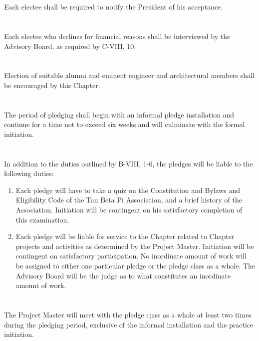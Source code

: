 \documentclass[12pt]{constitution}
\begin{document}
\section{}
Each electee shall be required to notify the President of his acceptance.
\section{}
Each electee who declines for financial reasons shall be interviewed by the Advisory Board, as required by C-VIII, 10.
\section{}
Election of suitable alumni and eminent engineer and architectural members shall be encouraged by this Chapter.

\section{}
The period of pledging shall begin with an informal pledge installation and continue for a time not to exceed six weeks and will culminate with the formal initiation.
\section{}
In addition to the duties outlined by B-VIII, 1-6, the pledges will be liable to the following duties:
\begin{enumerate}
	\item Each pledge will have to take a quiz on the Constitution and Bylaws and Eligibility Code of the Tau Beta Pi Association, and a brief history of the Association. Initiation will be contingent on his satisfactory completion of this examination.
	\item Each pledge will be liable for service to the Chapter related to Chapter projects
	and activities as determined by the Project Master. Initiation will be contingent on satisfactory participation. No inordinate amount of work will be assigned to either one particular pledge or the pledge class as a whole. The Advisory Board will be the judge as to what constitutes an inordinate amount of work.
\end{enumerate}
\section{}
The Project Master will meet with the pledge c;ass as a whole at least two times during the pledging period, exclusive of the informal installation and the practice initiation.
\end{document}
